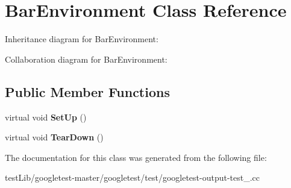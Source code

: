 \hypertarget{classBarEnvironment}{}\section{Bar\+Environment Class Reference}
\label{classBarEnvironment}


Inheritance diagram for Bar\+Environment\+:


Collaboration diagram for Bar\+Environment\+:
\subsection*{Public Member Functions}
\begin{DoxyCompactItemize}
\item 
\mbox{\label{classBarEnvironment_a88e17c5dd1dcea7a4538f2f3c6bf7bdd}} 
virtual void {\bfseries Set\+Up} ()
\item 
\mbox{\label{classBarEnvironment_a384f951da72a2a18bb0c2b3506376b09}} 
virtual void {\bfseries Tear\+Down} ()
\end{DoxyCompactItemize}


The documentation for this class was generated from the following file\+:\begin{DoxyCompactItemize}
\item 
test\+Lib/googletest-\/master/googletest/test/googletest-\/output-\/test\+\_\+.\+cc\end{DoxyCompactItemize}
